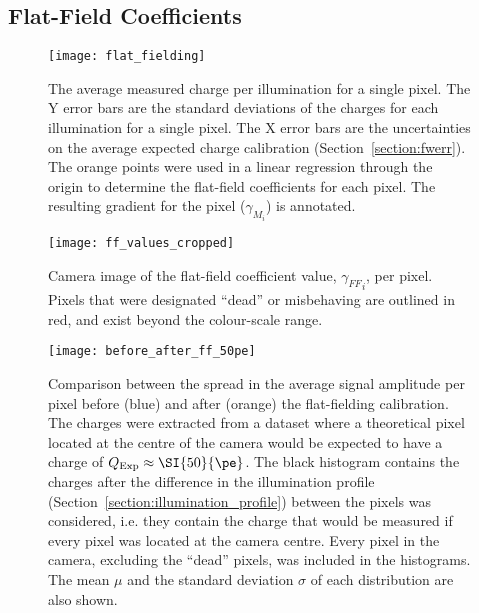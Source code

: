 \subsection{Flat-Field Coefficients}

\begin{figure}
	\centering
    \texttt{[image: flat\_fielding]} 
	\caption[Flat-field calibration]{The average measured charge per illumination for a single pixel. The Y error bars are the standard deviations of the charges for each illumination for a single pixel. The X error bars are the uncertainties on the average expected charge calibration (Section~\ref{section:fwerr}). The orange points were used in a linear regression through the origin to determine the flat-field coefficients for each pixel. The resulting gradient for the pixel ($\gamma_{M_i}$) is annotated.} 
	\label{fig:flat_fielding}
\end{figure}

\begin{figure}
	\centering
    \texttt{[image: ff\_values\_cropped]} 
	\caption[Flat-field Coefficients]{Camera image of the flat-field coefficient value, ${\gamma_{FF}}_i$, per pixel. Pixels that were designated ``dead'' or misbehaving are outlined in red, and exist beyond the colour-scale range.}
	\label{fig:ff_values}
\end{figure}

\begin{figure}
	\centering
    \texttt{[image: before\_after\_ff\_50pe]} 
	\caption[Flat-field residuals.]{Comparison between the spread in the average signal amplitude per pixel before (blue) and after (orange) the flat-fielding calibration. The charges were extracted from a dataset where a theoretical pixel located at the centre of the camera would be expected to have a charge of $Q_\text{Exp} \approx \SI{50}{\pe}$. The black histogram contains the charges after the difference in the illumination profile (Section~\ref{section:illumination_profile}) between the pixels was considered, i.e. they contain the charge that would be measured if every pixel was located at the camera centre. Every pixel in the camera, excluding the ``dead'' pixels, was included in the histograms. The mean $\mu$ and the standard deviation $\sigma$ of each distribution are also shown.}
	\label{fig:before_after_ff_50pe}
\end{figure}

